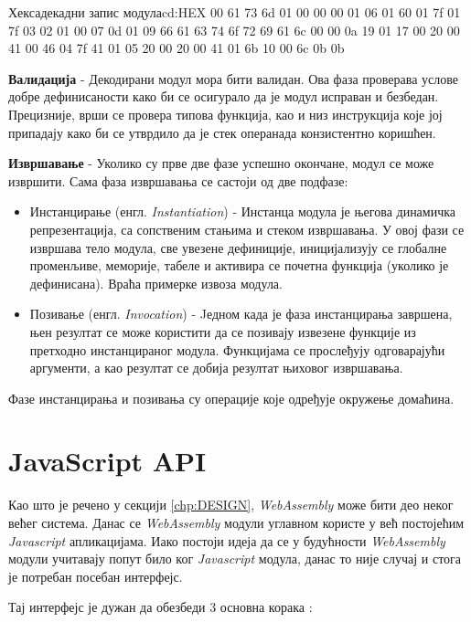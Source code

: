 \documentclass[12pt,oneside]{memoir}
\begin{document}
\begin{code}{Хексадекадни запис модула}{cd:HEX}
00 61 73 6d 01 00 00 00 01 06 01 60 01 7f 01 7f
03 02 01 00 07 0d 01 09 66 61 63 74 6f 72 69 61
6c 00 00 0a 19 01 17 00 20 00 41 00 46 04 7f 41
01 05 20 00 20 00 41 01 6b 10 00 6c 0b 0b
\end{code}

\textbf{Валидација} - Декодирани модул мора бити валидан. Ова фаза проверава услове добре дефинисаности како би се
осигурало да је модул исправан и безбедан. Прецизније, врши се провера типова функција, као и низ инструкција које
јој припадају како би се утврдило да је стек операнада конзистентно коришћен.

\textbf{Извршавање} - Уколико су прве две фазе успешно окончане, модул се може извршити. Сама фаза извршавања се
састоји од две подфазе:

\begin{itemize}
	\item Инстанцирање (енгл. \textit{Instantiation}) - Инстанца модула је његова динамичка репрезентација, са
	сопственим стањима и стеком извршавања. У овој	фази се извршава тело модула, све увезене дефиниције,
	иницијализују се глобалне променљиве, меморије, табеле и активира се почетна функција (уколико је дефинисана).
	Враћа примерке извоза модула.
	\item Позивање (енгл. \textit{Invocation}) - Jедном када је фаза инстанцирања завршена, њен резултат се може
	користити да се позивају извезене функције из претходно инстанцираног модула. Функцијама се прослеђују
	одговарајући аргументи, а као резултат се добија резултат њиховог извршавања.
\end{itemize}
Фазе инстанцирања и позивања су операције које одређује окружење домаћина.

\section{JavaScript API} \label{chp:JSA}

Као што је речено у секцији \ref{chp:DESIGN}, \textit{WebAssembly} може бити део неког већег система. Данас се
\textit{WebAssembly} модули углавном користе у већ постојећим \textit{Javascript} апликацијама.
Иако постоји идеја да се у будућности \textit{WebAssembly} модули учитавају попут било ког \textit{Javascript}
модула, данас то није случај и стога је потребан посебан интерфејс.

Тај интерфејс је дужан да обезбеди 3 основна корака \cite{WASMJS}:
\end{document}

